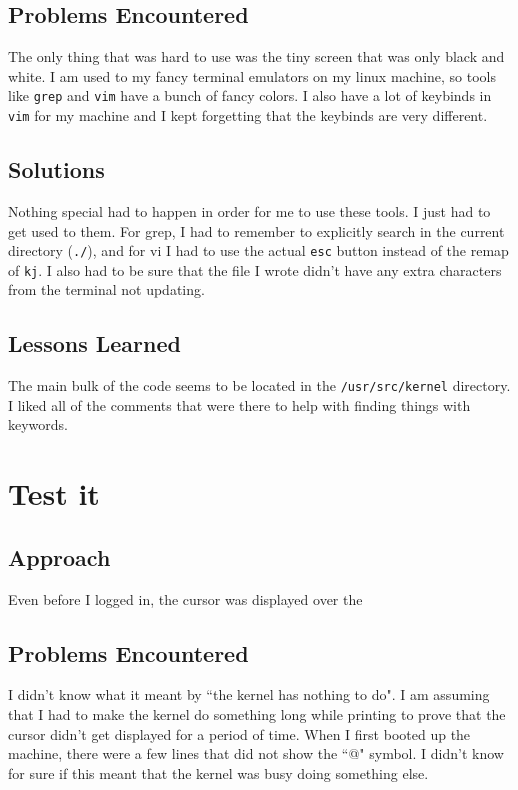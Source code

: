 \documentclass[11pt]{article}
\begin{document}
\subsection{Problems Encountered}
The only thing that was hard to use was the tiny screen that was only black and white. I am used to my fancy terminal emulators on my {\sc linux} machine, so tools like {\tt grep} and {\tt vim} have a bunch of fancy colors. I also have a lot of keybinds in {\tt vim} for my machine and I kept forgetting that the keybinds are very different.

\subsection{Solutions}
Nothing special had to happen in order for me to use these tools. I just had to get used to them. For grep, I had to remember to explicitly search in the current directory ({\tt ./}), and for vi I had to use the actual {\tt esc} button instead of the remap of {\tt kj}. I also had to be sure that the file I wrote didn't have any extra characters from the terminal not updating. 

\subsection{Lessons Learned}
The main bulk of the code seems to be located in the {\tt /usr/src/kernel} directory. I liked all of the comments that were there to help with finding things with keywords. 

\section{Test it}
\subsection{Approach}
Even before I logged in, the cursor was displayed over the

\subsection{Problems Encountered}
I didn't know what it meant by ``the kernel has nothing to do". I am assuming that I had to make the kernel do something long while printing to prove that the cursor didn't get displayed for a period of time. When I first booted up the machine, there were a few lines that did not show the ``@" symbol. I didn't know for sure if this meant that the kernel was busy doing something else. 
\end{document}
